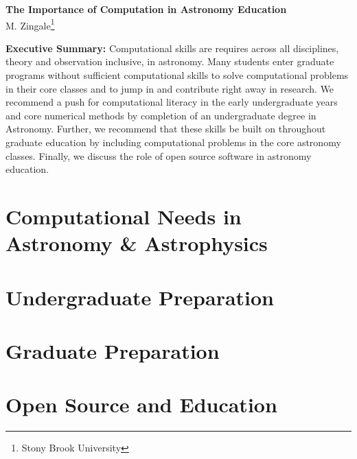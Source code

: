 \documentclass[11pt]{article}
\begin{document}
\thispagestyle{plain}

\begin{center}
{\Large \sffamily \bfseries The Importance of Computation in Astronomy Education} \\
{M. Zingale\footnote{Stony Brook University}}
\end{center}

\begin{tcolorbox}
{\sffamily \bfseries Executive Summary:} Computational skills are requires
across all disciplines, theory and observation inclusive, in astronomy.
Many students enter graduate programs without sufficient computational skills
to solve computational problems in their core classes and to jump in and
contribute right away in research.  We recommend a push for computational
literacy in the early undergraduate years and core numerical methods by
completion of an undergraduate degree in Astronomy.  Further, we recommend
that these skills be built on throughout graduate education by including
computational problems in the core astronomy classes.  Finally, we discuss
the role of open source software in astronomy education.
\end{tcolorbox}

\section{Computational Needs in Astronomy \& Astrophysics}

\section{Undergraduate Preparation}

\section{Graduate Preparation}

\section{Open Source and Education}
\end{document}
